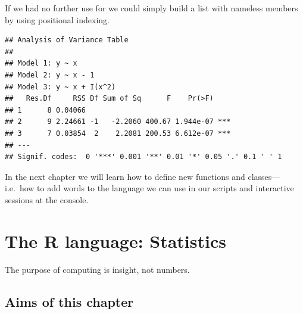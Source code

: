 \documentclass[krantz2]{krantz}\usepackage{knitr}%
\begin{document}
If we had no further use for  we could simply build a list with nameless members by using positional indexing.
\begin{knitrout}\footnotesize
{}\color{fgcolor}\begin{kframe}
\begin{alltt}
 \hlkwb{<-} \hlstd{()}
 \hlkwb{<-}  \hlopt{~}  \hlopt{~}  \hlopt{-}  \hlopt{~}  \hlopt{+} \hlopt{^}\hlstd{))}
   \hlstd{(} 
    \hlkwb{<-}   
   \hlstd{\}}
\end{alltt}
\begin{verbatim}
## Analysis of Variance Table
## 
## Model 1: y ~ x
## Model 2: y ~ x - 1
## Model 3: y ~ x + I(x^2)
##   Res.Df     RSS Df Sum of Sq      F    Pr(>F)    
## 1      8 0.04066                                  
## 2      9 2.24661 -1   -2.2060 400.67 1.944e-07 ***
## 3      7 0.03854  2    2.2081 200.53 6.612e-07 ***
## ---
## Signif. codes:  0 '***' 0.001 '**' 0.01 '*' 0.05 '.' 0.1 ' ' 1
\end{verbatim}
\end{kframe}
\end{knitrout}

In the next chapter we will learn how to define new functions and classes---i.e.\ how to add words to the language we can use in our scripts and interactive sessions at the \Rpgrm console. 




\chapter{The R language: Statistics}\label{chap:R:functions}

\begin{VF}
The purpose of computing is insight, not numbers.

\end{VF}

\section{Aims of this chapter}
\end{document}
